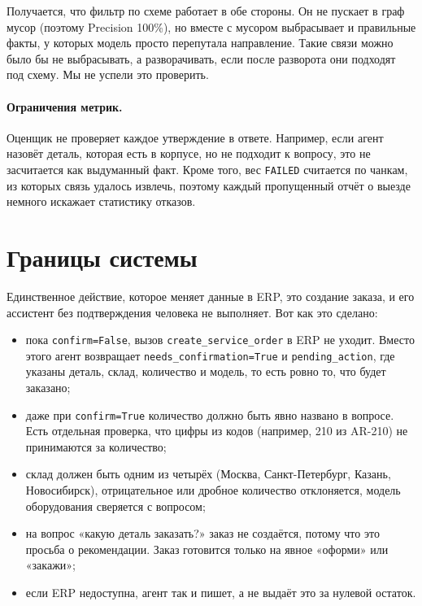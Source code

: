 \documentclass[a4paper,12pt]{article}
\newcommand{\code}[1]{\texttt{#1}}
\begin{document}
Получается, что фильтр по схеме работает в обе стороны. Он не пускает в граф мусор (поэтому Precision 100\%), но вместе с мусором выбрасывает и правильные факты, у которых модель просто перепутала направление. Такие связи можно было бы не выбрасывать, а разворачивать, если после разворота они подходят под схему. Мы не успели это проверить.

\paragraph{Ограничения метрик.} Оценщик не проверяет каждое утверждение в ответе. Например, если агент назовёт деталь, которая есть в корпусе, но не подходит к вопросу, это не засчитается как выдуманный факт. Кроме того, вес \code{FAILED} считается по чанкам, из которых связь удалось извлечь, поэтому каждый пропущенный отчёт о выезде немного искажает статистику отказов.

\section{Границы системы}

Единственное действие, которое меняет данные в ERP, это создание заказа, и его ассистент без подтверждения человека не выполняет. Вот как это сделано:
\begin{itemize}
\item пока \code{confirm=False}, вызов \code{create\_service\_order} в ERP не уходит. Вместо этого агент возвращает \code{needs\_confirmation=True} и \code{pending\_action}, где указаны деталь, склад, количество и модель, то есть ровно то, что будет заказано;
\item даже при \code{confirm=True} количество должно быть явно названо в вопросе. Есть отдельная проверка, что цифры из кодов (например, 210 из AR-210) не принимаются за количество;
\item склад должен быть одним из четырёх (Москва, Санкт-Петербург, Казань, Новосибирск), отрицательное или дробное количество отклоняется, модель оборудования сверяется с вопросом;
\item на вопрос «какую деталь заказать?» заказ не создаётся, потому что это просьба о рекомендации. Заказ готовится только на явное «оформи» или «закажи»;
\item если ERP недоступна, агент так и пишет, а не выдаёт это за нулевой остаток.
\end{itemize}
\end{document}
